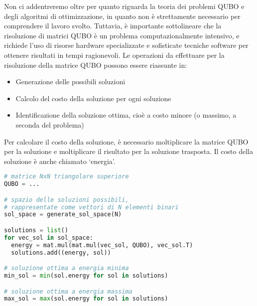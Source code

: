 Non ci addentreremo oltre per quanto riguarda la teoria dei problemi QUBO e degli algoritmi di ottimizzazione, in quanto non è strettamente necessario per comprendere il lavoro svolto. Tuttavia, è importante sottolineare che la risoluzione di matrici QUBO è un problema computazionalmente intensivo, e richiede l'uso di risorse hardware specializzate e sofisticate tecniche software per ottenere risultati in tempi ragionevoli. Le operazioni da effettuare per la risoluzione della matrice QUBO possono essere riassunte in: 

\begin{itemize}
    \item Generazione delle possibili soluzioni
    \item Calcolo del costo della soluzione per ogni soluzione
    \item Identificazione della soluzione ottima, cioè a costo minore (o massimo, a seconda del problema)
\end{itemize}

Per calcolare il costo della soluzione, è necessario moltiplicare la matrice QUBO per la soluzione e moltiplicare il risultato per la soluzione trasposta. Il costo della soluzione è anche chiamato `energia'.

\vspace{5mm}
\begin{lstlisting}[language=Python, caption=Pseudocodice risoluzione matrice QUBO, label=lis:qubo_sol]
# matrice NxN triangolare superiore
QUBO = ...

# spazio delle soluzioni possibili, 
# rappresentate come vettori di N elementi binari
sol_space = generate_sol_space(N)

solutions = list()
for vec_sol in sol_space:
  energy = mat.mul(mat.mul(vec_sol, QUBO), vec_sol.T)
  solutions.add((energy, sol))

# soluzione ottima a energia minima
min_sol = min(sol.energy for sol in solutions)

# soluzione ottima a energia massima
max_sol = max(sol.energy for sol in solutions)
\end{lstlisting}
\vspace{5mm}
 
